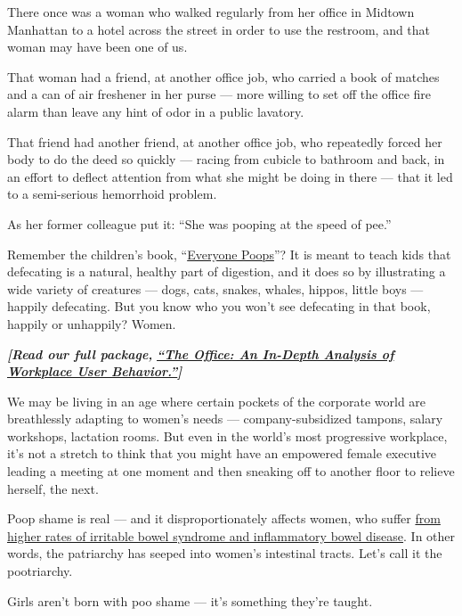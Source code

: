 There once was a woman who walked regularly from her office in Midtown
Manhattan to a hotel across the street in order to use the restroom, and
that woman may have been one of us.

That woman had a friend, at another office job, who carried a book of
matches and a can of air freshener in her purse --- more willing to set
off the office fire alarm than leave any hint of odor in a public
lavatory.

That friend had another friend, at another office job, who repeatedly
forced her body to do the deed so quickly --- racing from cubicle to
bathroom and back, in an effort to deflect attention from what she might
be doing in there --- that it led to a semi-serious hemorrhoid problem.

As her former colleague put it: ``She was pooping at the speed of pee.''

Remember the children's book,
``\href{https://www.amazon.com/Everyone-Turtleback-School-Library-Binding/dp/0613685725/ref=sr_1_1?keywords=everybody+poops\&qid=1568487804\&s=books\&sr=1-1}{Everyone
Poops}''? It is meant to teach kids that defecating is a natural,
healthy part of digestion, and it does so by illustrating a wide variety
of creatures --- dogs, cats, snakes, whales, hippos, little boys ---
happily defecating. But you know who you won't see defecating in that
book, happily or unhappily? Women.

\emph{\textbf{{[}Read our full package,}}
\textbf{\href{https://www.nytimes3xbfgragh.onion/interactive/2019/09/17/style/the-office.html}{\emph{``The
Office: An In-Depth Analysis of Workplace User Behavior.''}}\emph{{]}}}

We may be living in an age where certain pockets of the corporate world
are breathlessly adapting to women's needs --- company-subsidized
tampons, salary workshops, lactation rooms. But even in the world's most
progressive workplace, it's not a stretch to think that you might have
an empowered female executive leading a meeting at one moment and then
sneaking off to another floor to relieve herself, the next.

Poop shame is real --- and it disproportionately affects women, who
suffer \href{https://gi.org/topics/common-gi-problems-in-women/}{from
higher rates of irritable bowel syndrome and inflammatory bowel
disease}. In other words, the patriarchy has seeped into women's
intestinal tracts. Let's call it the pootriarchy.

Girls aren't born with poo shame --- it's something they're taught.

